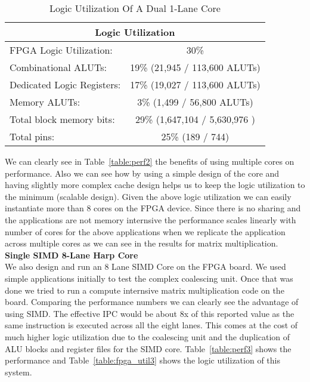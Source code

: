 \begin{table}[!htbp]
  \centering
  \begin{tabular}{|l|c|}
    \hline
    \multicolumn{2}{|c|}{Logic Utilization} \\
    \hline
FPGA Logic Utilization:		& 30\% 	\\
   Combinational ALUTs:		& 19\% 	(21,945 / 113,600 ALUTs)\\
   Dedicated Logic Registers:	& 17\% 	(19,027 / 113,600 ALUTs)\\
   Memory ALUTs:		& 3\% 	(1,499 / 56,800 ALUTs)\\
Total block memory bits:	& 29\%  (1,647,104 / 5,630,976 )\\
Total pins:			& 25\% 	(189 / 744)\\
    \hline
  \end{tabular}
  \caption{Logic Utilization Of A Dual 1-Lane Core}
  \label{table:fpga_util2}
\end{table}

We can clearly see in Table~\ref{table:perf2} the benefits of using multiple cores on performance. Also we can see how by using a simple design of the core and having slightly more complex cache design helps us to keep the logic utilization to the minimum (scalable design). Given the above logic utilization we can easily instantiate more than 8 cores on the FPGA device.
Since there is no sharing and the applications are not memory internsive the performance scales linearly with number of cores for the above applications when we replicate the application across multiple cores as we can see in the results for matrix multiplication. \\

\noindent\textbf{Single SIMD 8-Lane Harp Core}\\
We also design and run an 8 Lane SIMD Core on the FPGA board. We used simple applications initially to test the complex coalescing unit. Once that was done we tried to run a compute internsive matrix multiplication code on the board. Comparing the performance numbers we can clearly see the advantage of using SIMD. The effective IPC would be about 8x of this reported value as the same instruction is executed across all the eight lanes. This comes at the cost of much higher logic utilization due to the coalescing unit and the duplication of ALU blocks and register files for the SIMD core. Table~\ref{table:perf3} shows the performance and Table~\ref{table:fpga_util3} shows the logic utilization of this system.

